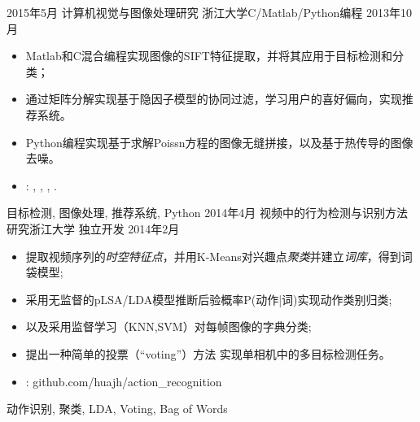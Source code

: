 %
%


 
\begin{experiences}
			
 \experience
    {2015年5月}   {计算机视觉与图像处理研究}{ 浙江大学}{C/Matlab/Python编程}
    {2013年10月} {
                      \begin{itemize}
                        \item Matlab和C混合编程实现图像的SIFT特征提取，并将其应用于目标检测和分类；
                        \item 通过矩阵分解实现基于隐因子模型的协同过滤，学习用户的喜好偏向，实现推荐系统。
                        \item Python编程实现基于求解Poissn方程的图像无缝拼接，以及基于热传导的图像去噪。
                        \item \faGithub: 
                        , 
                        ,
                        ,
                        .                                                                                       
                      \end{itemize}
                    }
                    {目标检测, 图像处理, 推荐系统, Python}
  \emptySeparator
  \experience
    { 2014年4月} {视频中的行为检测与识别方法研究}{浙江大学}{ 独立开发}
    {2014年2月}    {
                      \begin{itemize}
                        \item 提取视频序列的\emph{时空特征点}，并用K-Means对兴趣点\emph{聚类}并建立\emph{词库}，得到词袋模型; 
                        \item 采用无监督的pLSA/LDA模型推断后验概率P(动作|词)实现动作类别归类;
                        \item 以及采用监督学习（KNN,SVM）对每帧图像的字典分类;                    
                        \item 提出一种简单的投票（``voting''）方法 实现单相机中的多目标检测任务。
                        \item \faGithub:  {github.com/huajh/action\_recognition}                                                                                          
                      \end{itemize}
                    }
                    {动作识别, 聚类, LDA, Voting, Bag of Words}
	

\end{experiences}
